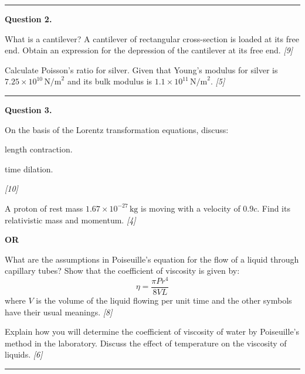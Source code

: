 \documentclass[11pt,a4paper]{article}
\newcommand{\pts}[1]{\hfill   \textit{[#1]}}
\begin{document}
\medskip\rule{\linewidth}{0.2pt}




\noindent   \textbf{Question 2.}

\begin{parts}
  \item What is a cantilever? A cantilever of rectangular cross-section is loaded at its free end. Obtain an expression for the depression of the cantilever at its free end. \pts{9}
  \item Calculate Poisson's ratio for silver. Given that Young's modulus for silver is $7.25  \times 10^{10}\, \text{N/m}^2$ and its bulk modulus is $1.1  \times 10^{11}\, \text{N/m}^2$. \pts{5}
\end{parts}

\medskip\rule{\linewidth}{0.2pt}




\noindent   \textbf{Question 3.}

\begin{parts}
  \item On the basis of the Lorentz transformation equations, discuss:
    
\begin{parts}
      \item length contraction.
      \item time dilation.
    \end{parts} \pts{10}
  \item A proton of rest mass $1.67  \times 10^{-27}\, \text{kg}$ is moving with a velocity of $0.9c$. Find its relativistic mass and momentum. \pts{4}
\end{parts}
\hfill   \textbf{OR}

\begin{parts}
  \item What are the assumptions in Poiseuille's equation for the flow of a liquid through capillary tubes? Show that the coefficient of viscosity is given by:
    \[ \eta = \frac{\pi P r^4}{8 V L} \]
    where $V$ is the volume of the liquid flowing per unit time and the other symbols have their usual meanings. \pts{8}
  \item Explain how you will determine the coefficient of viscosity of water by Poiseuille's method in the laboratory. Discuss the effect of temperature on the viscosity of liquids. \pts{6}
\end{parts}

\medskip\rule{\linewidth}{0.2pt}
\end{document}
